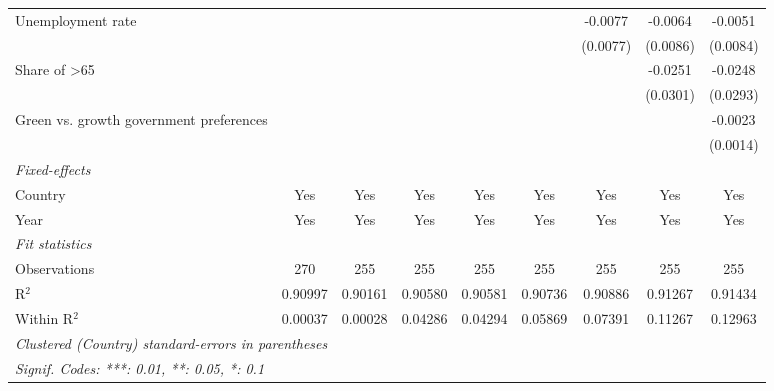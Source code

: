 \begin{table}[htbp]
\begin{tabular}{lcccccccc}
      Unemployment rate                       &          &          &               &               &               & -0.0077       & -0.0064      & -0.0051\\   
                                              &          &          &               &               &               & (0.0077)      & (0.0086)     & (0.0084)\\   
      Share of >65                            &          &          &               &               &               &               & -0.0251      & -0.0248\\   
                                              &          &          &               &               &               &               & (0.0301)     & (0.0293)\\   
      Green vs. growth government preferences &          &          &               &               &               &               &              & -0.0023\\   
                                              &          &          &               &               &               &               &              & (0.0014)\\   
      \midrule
      \emph{Fixed-effects}\\
      Country                                 & Yes      & Yes      & Yes           & Yes           & Yes           & Yes           & Yes          & Yes\\  
      Year                                    & Yes      & Yes      & Yes           & Yes           & Yes           & Yes           & Yes          & Yes\\  
      \midrule
      \emph{Fit statistics}\\
      Observations                            & 270      & 255      & 255           & 255           & 255           & 255           & 255          & 255\\  
      R$^2$                                   & 0.90997  & 0.90161  & 0.90580       & 0.90581       & 0.90736       & 0.90886       & 0.91267      & 0.91434\\  
      Within R$^2$                            & 0.00037  & 0.00028  & 0.04286       & 0.04294       & 0.05869       & 0.07391       & 0.11267      & 0.12963\\  
      \midrule \midrule
      \multicolumn{9}{l}{\emph{Clustered (Country) standard-errors in parentheses}}\\
      \multicolumn{9}{l}{\emph{Signif. Codes: ***: 0.01, **: 0.05, *: 0.1}}\\
   \end{tabular}
\end{table}


